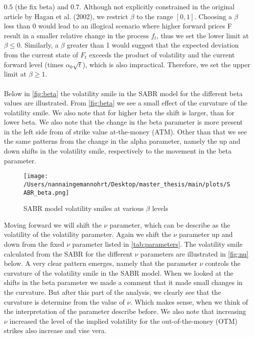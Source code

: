 $0.5$ (the fix beta) and $0.7$. 
Although not explicitly constrained in the original article by Hagan et al. (2002), we restrict $\beta$ to the range $[0, 1]$. 
Choosing a $\beta$ less than 0 would lead to an illogical scenario where higher forward prices F result in a smaller 
relative change in the process $f_t$, thus we set the lower limit at $\beta \leq 0$. Similarly, a $\beta$ greater than 1 would 
suggest that the expected deviation from the current state of $F_t$ exceeds the product of volatility and the current 
forward level (times $\alpha_0 \sqrt{t}$), which is also impractical. Therefore, we set the upper limit at $\beta \geq 1$.
\\\\
Below in \autoref{fig:beta} the volatility smile in the SABR model for the different beta values are illustrated.
From \autoref{fig:beta} we see a small effect of the curvature of the volatility smile. We also note that for higher 
beta the shift is larger, than for lower beta. We also note that the change in the beta parameter is more present in 
the left side from of strike value at-the-money (ATM). Other than that we see the same patterns from the change in 
the alpha parameter, namely the up and down shifts in the volatility smile, respectively to the movement in the 
beta parameter.
\begin{figure}[H]
    \centering
    \texttt{[image: /Users/nannaingemannohrt/Desktop/master\_thesis/main/plots/SABR\_beta.png]}
    \caption{SABR model volatility smiles at various $\beta$ levels}
    \label{fig:beta}
\end{figure}
\noindent
Moving forward we will shift the $\nu$ parameter, which can be describe as the volatility of the volatility parameter.
Again we shift the $\nu$ parameter up and down from the fixed $\nu$ parameter listed in \autoref{tab:parameters}.
The volatility smile calculated from the SABR for the different $\nu$ parameters are illustrated in \autoref{fig:nu} below.
A very clear pattern emerges, namely that the parameter $\nu$ controls the curvature of the volatility smile in
the SABR model. When we looked at the shifts in the beta parameter we made a comment that it made small changes in 
the curvature. But after this part of the analysis, we clearly see that the curvature is determine from the value
of $\nu$. Which makes sense, when we think of the interpretation of the parameter describe before.
We also note that increasing $\nu$  increased the level of the implied volatility for the 
out-of-the-money (OTM) strikes also increase and vise vera.
